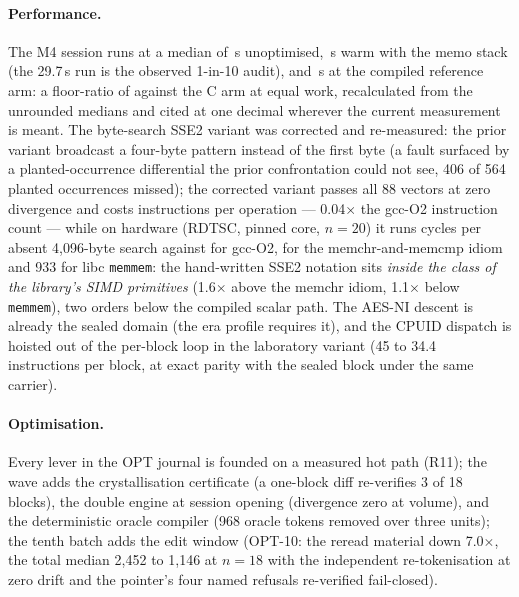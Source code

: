 \documentclass[11pt,a4paper]{article}
\newcommand{\code}[1]{\texttt{\small #1}}
\begin{document}
\paragraph{Performance.} The M4 session runs at a median of
\mquatreAvantMediane{}\,s unoptimised, \mquatreChaudMediane{}\,s warm
with the memo stack (the 29.7\,s run is the observed 1-in-10 audit),
and \mquatreBrasC{}\,s at the compiled reference arm: a floor-ratio
of \mquatreRatioChaud{} against the C arm at equal work, recalculated
from the unrounded medians and cited at one decimal wherever the
current measurement is meant. The byte-search SSE2 variant was
corrected and re-measured: the prior variant broadcast a four-byte
pattern instead of the first byte (a fault surfaced by a
planted-occurrence differential the prior confrontation could not
see, 406 of 564 planted occurrences missed); the corrected variant
passes all 88 vectors at zero divergence and costs \sseDeuxVdeuxInstructions{}
instructions per operation --- 0.04$\times$ the gcc-O2 instruction
count --- while on hardware (RDTSC, pinned core, $n{=}20$) it runs
\sseDeuxTempsReel{} cycles per absent 4{,}096-byte search against
\gccODeuxTempsReel{} for gcc-O2, \idiomeMemchrTempsReel{} for the
memchr-and-memcmp idiom and 933 for libc \code{memmem}: the
hand-written SSE2 notation sits \emph{inside the class of the library's
SIMD primitives} (1.6$\times$ above the memchr idiom, 1.1$\times$
below \code{memmem}), two orders below the compiled scalar path. The
AES-NI descent is already the sealed domain (the era profile requires
it), and the CPUID dispatch is hoisted out of the per-block loop in
the laboratory variant (45 to 34.4 instructions per block, at exact
parity with the sealed block under the same carrier).

\paragraph{Optimisation.} Every lever in the OPT journal is founded on
a measured hot path (R11); the wave adds the crystallisation certificate
(a one-block diff re-verifies 3 of 18 blocks), the double engine at
session opening (divergence zero at volume), and the deterministic
oracle compiler (968 oracle tokens removed over three units); the
tenth batch adds the edit window (OPT-10: the reread material down
7.0$\times$, the total median 2{,}452 to 1{,}146 at $n{=}18$ with the
independent re-tokenisation at zero drift and the pointer's four
named refusals re-verified fail-closed).
\end{document}
